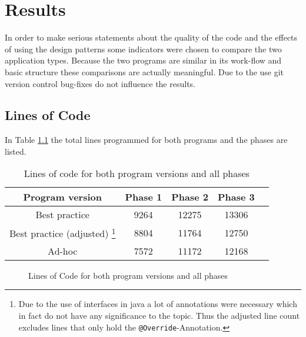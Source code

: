 \chapter{Results}
In order to make serious statements about the quality of the code and the effects of using the design patterns some indicators were chosen to compare the two application types. Because the two programs are similar in its work-flow and basic structure these comparisons are actually meaningful. Due to the use git version control bug-fixes do not influence the results.

\section{Lines of Code}
\label{sec:line-count}
In Table \ref{table:lines-of-code} the total lines programmed for both programs and the phases are listed.

\begin{table}
	\centering
	\label{table:lines-of-code}
	\begin{tabular}{|c|c|c|c|c|} \hline
	\textbf{Program version} &\textbf{Phase 1} & \textbf{Phase 2} & \textbf{Phase 3} \\ \hline
	Best practice & 9264 & 12275 & 13306 \\ \hline
	Best practice (adjusted) \footnote{Due to the use of interfaces in java a lot of annotations were necessary which in fact do not have any significance to the topic. Thus the adjusted line count excludes lines that only hold the \texttt{@Override}-Annotation.} & 8804 & 11764 & 12750 \\ \hline
	Ad-hoc & 7572 & 11172 & 12168 \\ \hline
	\end{tabular}
	\caption{Lines of code for both program versions and all phases}
\end{table}

\begin{figure}
	\centering
	\caption{Lines of Code for both program versions and all phases}
\end{figure}


